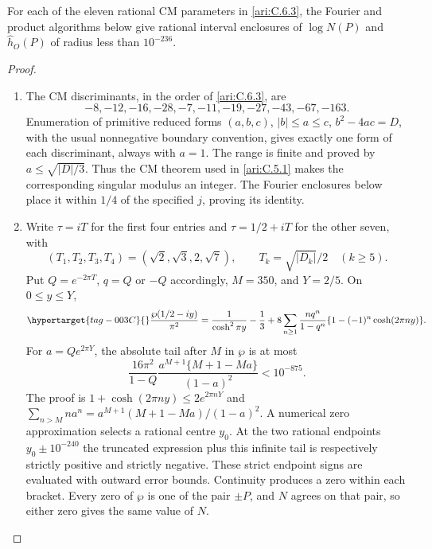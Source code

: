 \begin{proposition}\hypertarget{tag-000Z}{}\label{ari:C.6.5}

For each of the eleven rational CM parameters in \cref{ari:C.6.3},
the Fourier and product algorithms below give rational interval
enclosures of $\log N(P)$ and $\widehat h_O(P)$ of radius less
than $10^{-236}$.
\end{proposition}


\begin{proof}
\begin{enumerate}[label=\arabic*.,leftmargin=*]
\item The CM discriminants, in the order of \ref{ari:C.6.3}, are
\[
 -8,-12,-16,-28,-7,-11,-19,-27,-43,-67,-163.
\]
Enumeration of primitive reduced forms
$(a,b,c)$, $|b|\le a\le c$, $b^2-4ac=D$, with the usual
nonnegative boundary convention, gives exactly one form of
each discriminant, always with $a=1$.
The range is finite and proved by $a\le\sqrt{|D|/3}$.
Thus the CM theorem used in \ref{ari:C.5.1} makes the corresponding
singular modulus an integer. The Fourier enclosures below
place it within $1/4$ of the specified $j$, proving its
identity. 

\item Write $\tau=iT$ for the first four entries and
$\tau=1/2+iT$ for the other seven, with
\[
 (T_1,T_2,T_3,T_4)=(\sqrt2,\sqrt3,2,\sqrt7),\qquad
 T_k=\sqrt{|D_k|}/2\quad(k\ge5).
\]
Put $Q=e^{-2\pi T}$, $q=Q$ or $-Q$ accordingly,
$M=350$, and $Y=2/5$. On $0\le y\le Y$,
\begin{equation}\hypertarget{tag-003C}{}\label{ari:eq:ch-wp-bracket}
 \frac{\wp(1/2-iy)}{\pi^2}
 =\frac1{\cosh^2\pi y}-\frac13+
 8\sum_{n\ge1}\frac{nq^n}{1-q^n}
                 \{1-(-1)^n\cosh(2\pi ny)\}.
\end{equation}
For $a=Qe^{2\pi Y}$, the absolute tail after $M$ in
$\wp$ is at most
\[
 \frac{16\pi^2}{1-Q}
 \frac{a^{M+1}\{M+1-Ma\}}{(1-a)^2}<10^{-875}.
\]
The proof is $1+\cosh(2\pi ny)\le2e^{2\pi nY}$ and
$\sum_{n>M}na^n=a^{M+1}(M+1-Ma)/(1-a)^2$.
A numerical zero approximation selects a rational centre $y_0$. At the two rational endpoints
$y_0\pm10^{-240}$ the truncated expression plus this
infinite tail is respectively strictly positive and strictly
negative. These strict endpoint signs are evaluated with outward error bounds.
Continuity produces a zero within each bracket. Every zero
of $\wp$ is one of the pair $\pm P$, and $N$ agrees on
that pair, so either zero gives the same value of $N$.


\end{enumerate}
\end{proof}
